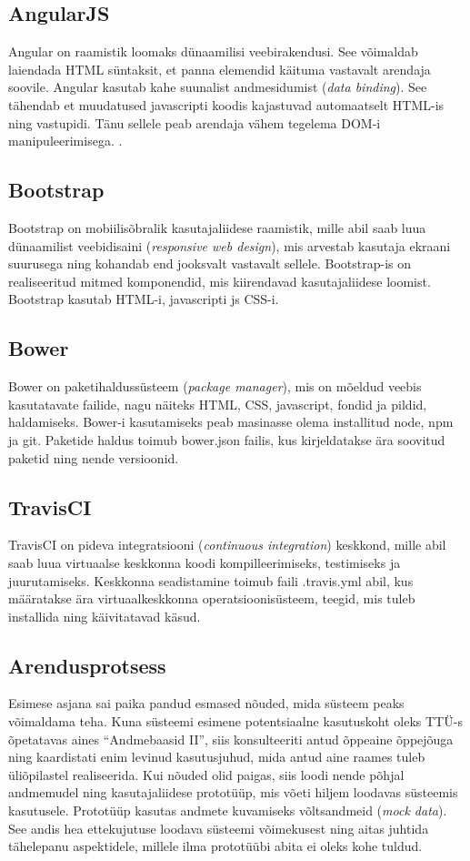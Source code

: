 \documentclass[a4paper,12pt]{article} %
\begin{document}
\subsection{AngularJS}
Angular on raamistik loomaks dünaamilisi veebirakendusi. See võimaldab laiendada HTML süntaksit, et panna elemendid käituma vastavalt arendaja soovile. Angular kasutab kahe suunalist andmesidumist (\textit{data binding}). See tähendab et muudatused javascripti koodis kajastuvad automaatselt HTML-is ning vastupidi. Tänu sellele peab arendaja vähem tegelema DOM-i manipuleerimisega.  \cite{AngularJS}.
\subsection{Bootstrap}
Bootstrap on mobiilisõbralik kasutajaliidese raamistik, mille abil saab luua dünaamilist veebidisaini (\textit{responsive web design}), mis arvestab kasutaja ekraani suurusega ning kohandab end jooksvalt vastavalt sellele. Bootstrap-is on realiseeritud mitmed komponendid, mis kiirendavad kasutajaliidese loomist. Bootstrap kasutab HTML-i, javascripti js CSS-i. \cite{Bootstrap}
\subsection{Bower}
Bower on paketihaldussüsteem (\textit{package manager}), mis on mõeldud veebis kasutatavate failide, nagu näiteks HTML, CSS, javascript, fondid ja pildid, haldamiseks. Bower-i kasutamiseks peab masinasse olema installitud node, npm ja git. Paketide haldus toimub bower.json failis, kus kirjeldatakse ära soovitud paketid ning nende versioonid. \cite{Bower}
\subsection{TravisCI}
TravisCI on pideva integratsiooni (\textit{continuous integration}) keskkond, mille abil saab luua virtuaalse keskkonna koodi kompilleerimiseks, testimiseks ja juurutamiseks. Keskkonna seadistamine toimub faili .travis.yml abil, kus määratakse ära virtuaalkeskkonna operatsioonisüsteem, teegid, mis tuleb installida ning käivitatavad käsud.
\subsection{Arendusprotsess}
Esimese asjana sai paika pandud esmased nõuded, mida süsteem peaks võimaldama teha. Kuna süsteemi esimene potentsiaalne kasutuskoht oleks TTÜ-s õpetatavas aines ``Andmebaasid II'', siis konsulteeriti antud õppeaine õppejõuga ning kaardistati enim levinud kasutusjuhud, mida antud aine raames tuleb üliõpilastel realiseerida. Kui nõuded olid paigas, siis loodi nende põhjal andmemudel ning kasutajaliidese prototüüp, mis võeti hiljem loodavas süsteemis kasutusele. Prototüüp kasutas andmete kuvamiseks võltsandmeid (\textit{mock data}). See andis hea ettekujutuse loodava süsteemi võimekusest ning aitas juhtida tähelepanu aspektidele, millele ilma prototüübi abita ei oleks kohe tuldud.\par
\end{document}
